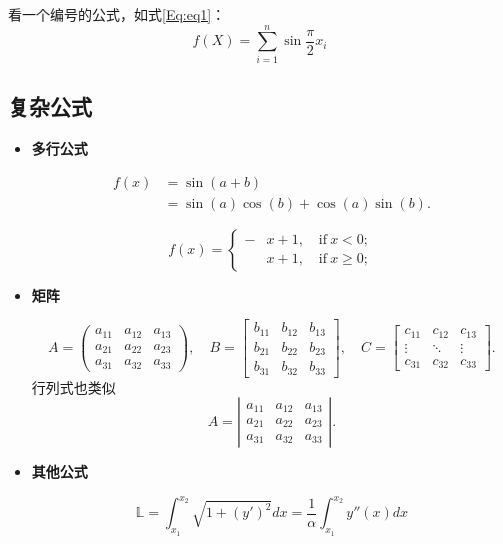 看一个编号的公式，如式\eqref{Eq:eq1}：
\begin{equation}\label{Eq:eq1}
f(X)=\sum_{i=1}^{n}\sin{\frac{\pi}{2}x_i}
\end{equation}

\subsection{复杂公式}
\begin{itemize}
\item \textbf{多行公式}

\begin{equation}\label{Eq:eq2}
\begin{aligned}
f(x) &= \sin(a+b)\\
&= \sin(a)\cos(b)+\cos(a)\sin(b).
\end{aligned}
\end{equation}

\begin{equation}\label{Eq:eq3}
f(x) = \left\{
\begin{aligned}
 -&x+1,\quad \text{if}~x<0;\\
 &x+1,\quad \text{if}~x \geq 0;
 \end{aligned}
 \right.
\end{equation}

\item \textbf{矩阵}

\[
  A = \left(\begin{array}{ccc}
        a_{11} & a_{12} & a_{13} \\
        a_{21} & a_{22} & a_{23} \\
        a_{31} & a_{32} & a_{33}
      \end{array}\right),\quad
  B = \left[\begin{array}{ccc}
        b_{11} & b_{12} & b_{13} \\
        b_{21} & b_{22} & b_{23} \\
        b_{31} & b_{32} & b_{33}
      \end{array}\right],\quad
   C = \left[\begin{array}{ccc}
     c_{11} & c_{12} & c_{13} \\
     \vdots & \ddots & \vdots \\
     c_{31} & c_{32} & c_{33}
   \end{array}\right].
\]
行列式也类似
\[
A = \left|\begin{array}{ccc}
    a_{11} & a_{12} & a_{13} \\
    a_{21} & a_{22} & a_{23} \\
    a_{31} & a_{32} & a_{33}
  \end{array}\right|.
\]

\item \textbf{其他公式}

\[
\mathbb{L} = \int_{x_1}^{x_2}\sqrt{1+(y')^2}dx 
= \frac{1}{\alpha}\int_{x_1}^{x_2}y''(x)dx
\]

\end{itemize}

